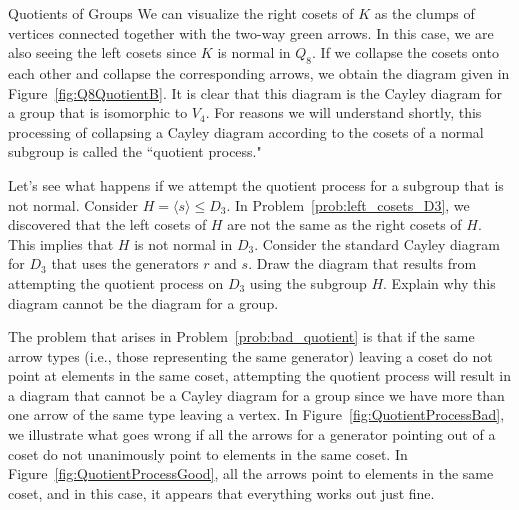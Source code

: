 \begin{section}{Quotients of Groups}
We can visualize the right cosets of $K$ as the clumps of vertices connected together with the two-way green arrows.  In this case, we are also seeing the left cosets since $K$ is normal in $Q_8$.  If we collapse the cosets onto each other and collapse the corresponding arrows, we obtain the diagram given in Figure~\ref{fig:Q8QuotientB}. It is clear that this diagram is the Cayley diagram for a group that is isomorphic to $V_4$.  For reasons we will understand shortly, this processing of collapsing a Cayley diagram according to the cosets of a normal subgroup is called the ``quotient process."

\begin{problem}\label{prob:bad_quotient}
Let's see what happens if we attempt the quotient process for a subgroup that is not normal.  Consider $H=\langle s\rangle \leq D_3$.  In Problem~\ref{prob:left_cosets_D3}, we discovered that the left cosets of $H$ are not the same as the right cosets of $H$.  This implies that $H$ is not normal in $D_3$.  Consider the standard Cayley diagram for $D_3$ that uses the generators $r$ and $s$.  Draw the diagram that results from attempting the quotient process on $D_3$ using the subgroup $H$.  Explain why this diagram cannot be the diagram for a group.
\end{problem}

The problem that arises in Problem~\ref{prob:bad_quotient} is that if the same arrow types (i.e., those representing the same generator) leaving a coset do not point at elements in the same coset, attempting the quotient process will result in a diagram that cannot be a Cayley diagram for a group since we have more than one arrow of the same type leaving a vertex.  In Figure~\ref{fig:QuotientProcessBad}, we illustrate what goes wrong if all the arrows for a generator pointing out of a coset do not unanimously point to elements in the same coset.  In Figure~\ref{fig:QuotientProcessGood}, all the arrows point to elements in the same coset, and in this case, it appears that everything works out just fine.


\end{section}
